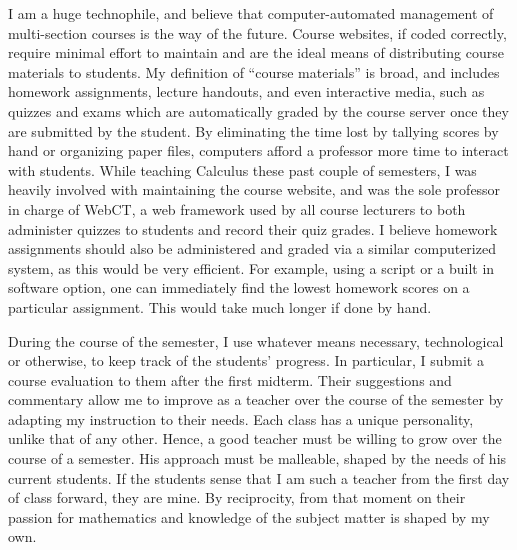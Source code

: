 \documentclass[12pt,oneside]{amsart}
\begin{document}
I am a huge technophile, and believe that computer-automated management of
multi-section courses is the way of the future. Course websites, if coded
correctly, require minimal effort to maintain and are the ideal means of
distributing course materials to students. My definition of ``course materials''
is broad, and includes homework assignments, lecture handouts, and even
interactive media, such as quizzes and exams which are automatically graded by
the course server once they are submitted by the student. By eliminating the
time lost by tallying scores by hand or organizing paper files,
computers afford a professor more time to interact with students. While teaching
Calculus these past couple of semesters, I was heavily involved with maintaining the
course website, and was the sole professor in charge of WebCT, a web framework
used by all course lecturers to both administer quizzes to students and 
record their quiz grades. I believe homework assignments should also be
administered and graded via a similar computerized system, as this would be very
efficient. For example, using a
script or a built in software option, one can immediately find the lowest
homework scores on a particular assignment. This would take much longer if done
by hand. 

During the course of the semester, I use whatever means necessary, technological
or otherwise, to keep track of the students' progress. In particular, I submit a
course evaluation to them after the first midterm. Their suggestions and
commentary allow me to improve as a teacher over the course of the semester by
adapting my instruction to their needs. Each class has a unique personality,
unlike that of any other. Hence, a good teacher must be willing to grow over the
course of a semester. His approach must be malleable, shaped by the needs of his
current students.  If the students sense that I am such a teacher from the first
day of class forward, they are mine. By reciprocity, from that moment on their
passion for mathematics and knowledge of the subject matter is shaped by my own. 
\end{document}
